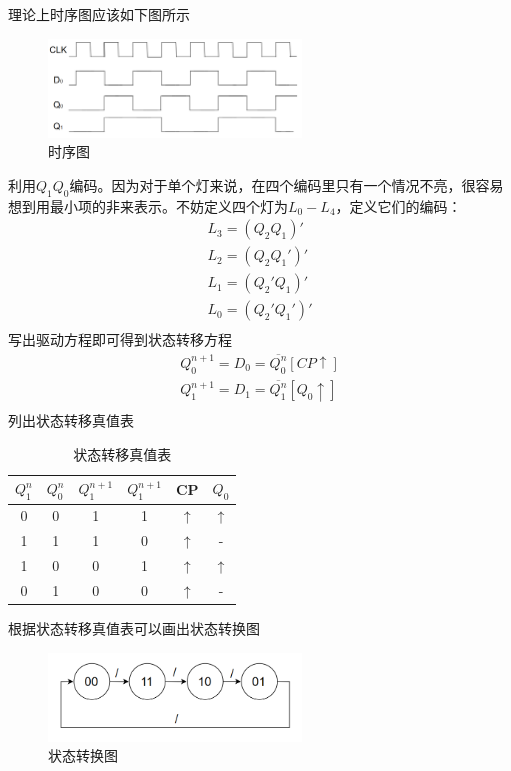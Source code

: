 \documentclass{ctexart}
\begin{document}
理论上时序图应该如下图所示
\begin{figure}[H]
    \centering
    \includegraphics[width=0.6\textwidth]{时序图.png}
    \caption{时序图}
\end{figure}
利用$Q_1Q_0$编码。因为对于单个灯来说，在四个编码里只有一个情况不亮，很容易想到用最小项的非来表示。不妨定义四个灯为$L_0-L_4$，定义它们的编码：
\begin{align}
    L_3=(Q_2Q_1)'\\
    L_2=(Q_2Q_1')'\\
    L_1=(Q_2'Q_1)'\\
    L_0=(Q_2'Q_1')'\\
\end{align}
写出驱动方程即可得到状态转移方程
\begin{align}
    Q_0^{n+1}=D_0=\overline{Q_0^n}[CP\uparrow]\\
    Q_1^{n+1}=D_1=\overline{Q_1^n}[Q_{0}\uparrow]\\
\end{align}
列出状态转移真值表
\begin{table}[H]
    \centering
    \caption{状态转移真值表}
    \begin{tabular}{cccccc}
    \hline 
        $Q_1^n$ & $Q_0^n$ & $Q_1^{n+1}$ & $Q_1^{n+1}$ & CP & $Q_0$\\ \hline 
        0 & 0 & 1 & 1 & $\uparrow$ & $\uparrow$\\
        1 & 1 & 1 & 0& $\uparrow$ & -\\
        1 & 0 & 0 & 1& $\uparrow$ & $\uparrow$\\
        0 & 1 & 0 & 0& $\uparrow$ & -\\ \hline 
    \end{tabular}
    \label{状态转移真值表}
\end{table}
根据状态转移真值表可以画出状态转换图
\begin{figure}[H]
    \centering
    \includegraphics[width=0.6\textwidth]{状态转换图.png}
    \caption{状态转换图}
\end{figure}
\end{document}
